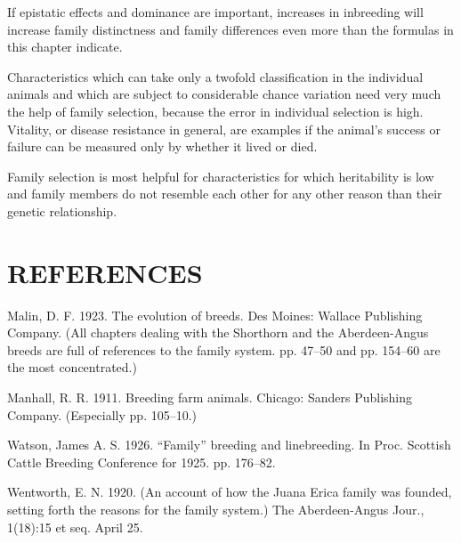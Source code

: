 If epistatic effects and dominance are important, increases in
inbreeding will increase family distinctness and family differences even
more than the formulas in this chapter indicate.

Characteristics which can take only a twofold classification in the
individual animals and which are subject to considerable chance variation
need very much the help of family selection, because the error in
individual selection is high. Vitality, or disease resistance in general,
are examples if the animal's success or failure can be measured only by
whether it lived or died.

Family selection is most helpful for characteristics for which heritability
is low and family members do not resemble each other for any
other reason than their genetic relationship.

\section*{REFERENCES}

\begin{hangparas}{0.5in}{1}%
Malin, D. F. 1923. The evolution of breeds. Des Moines: Wallace Publishing Company.
(All chapters dealing with the Shorthorn and the Aberdeen-Angus
breeds are full of references to the family system. pp. 47--50 and pp. 154--60
are the most concentrated.)

Manhall, R. R. 1911. Breeding farm animals. Chicago: Sanders Publishing Company.
(Especially pp. 105--10.)

Watson, James A. S. 1926. ``Family'' breeding and linebreeding. In Proc. Scottish
Cattle Breeding Conference for 1925. pp. 176--82.

Wentworth, E. N. 1920. (An account of how the Juana Erica family was founded,
setting forth the reasons for the family system.) The Aberdeen-Angus Jour.,
1(18):15 et seq. April 25.
\end{hangparas}